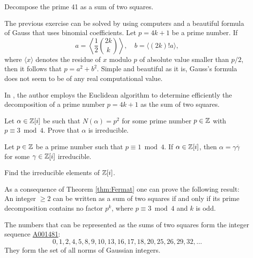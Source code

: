 \begin{exercise}
    Decompose the prime 41 as a sum of two squares. 
\end{exercise}

The previous exercise can be solved by using computers and 
a beautiful formula of Gauss that uses binomial coefficients. Let $p=4k+1$ be a prime number. 
If 
\[
a=\left\langle \frac12\binom{2k}{k}\right\rangle, 
\quad
b=\langle (2k)!a\rangle,
\]
where $\langle x\rangle$ denotes the 
residue of $x$ modulo $p$ of absolute value smaller than $p/2$, 
then it follows that $p=a^2+b^2$. Simple and beautiful as it is, Gauss's formula does not seem to be of any real computational value. 

In \cite{MR1041889}, the author employs the Euclidean algorithm to determine efficiently 
the decomposition of a prime number $p=4k+1$ as the sum of two squares.

\begin{exercise}
\label{xca:p=3(4)}
    Let $\alpha\in\mathbb{Z}[i]$ be such that $N(\alpha)=p^2$ 
    for some prime number $p\in\mathbb{Z}$ with $p\equiv3\bmod 4$. 
    Prove that $\alpha$ is irreducible. 
\end{exercise}

\begin{exercise}
    \label{xca:p=1(4)}
    Let $p\in\mathbb{Z}$ be a prime number such that $p\equiv1\bmod 4$.
    If $\alpha\in\mathbb{Z}[i]$, then $\alpha=\gamma\overline{\gamma}$
    for some $\gamma\in\mathbb{Z}[i]$ irreducible. 
\end{exercise}

\begin{exercise}
\label{xca:Z[i]irreducibles}
Find the irreducible elements of $\mathbb{Z}[i]$. 
\end{exercise}

As a consequence of Theorem \ref{thm:Fermat}
one can prove the following result: An integer $\geq2$ can be written as a sum of two squares if and only if its prime decomposition contains no factor $p^k$, where 
$p\equiv 3\bmod 4$ 
and $k$ is odd. 

The numbers that can be represented as the sums of two squares form the integer sequence \href{https://oeis.org/A001481}{A001481}: 
\[
0, 1, 2, 4, 5, 8, 9, 10, 13, 16, 17, 18, 20, 25, 26, 29, 32,\dots 
\] 
They form the set of all norms of Gaussian integers. 


